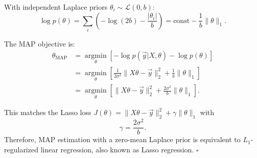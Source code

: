 \begin{answer}
With independent Laplace priors $\theta_i \sim \mathcal{L}(0,b)$:
$$\log p(\theta) = \sum_i \left(-\log(2b) - \frac{|\theta_i|}{b}\right) = \text{const} - \frac{1}{b}\|\theta\|_1.$$

The MAP objective is:
\begin{align*}
\theta_{\mathrm{MAP}} &= \operatorname*{argmin}_\theta \left[-\log p(\vec{y}|X,\theta) - \log p(\theta)\right]\\
&= \operatorname*{argmin}_\theta \left[\frac{1}{2\sigma^2}\|X\theta - \vec{y}\|_2^2 + \frac{1}{b}\|\theta\|_1\right]\\
&= \operatorname*{argmin}_\theta \left[\|X\theta - \vec{y}\|_2^2 + \frac{2\sigma^2}{b}\|\theta\|_1\right].
\end{align*}

This matches the Lasso loss $J(\theta) = \|X\theta - \vec{y}\|_2^2 + \gamma\|\theta\|_1$ with
$$\boxed{\gamma = \frac{2\sigma^2}{b}.}$$
Therefore, MAP estimation with a zero-mean Laplace prior is equivalent to $L_1$-regularized linear regression, also known as Lasso regression. $\square$
\end{answer}
